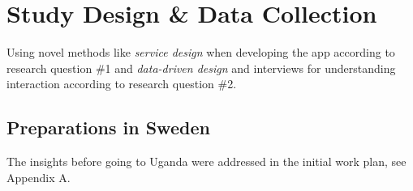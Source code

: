 \section{Study Design \& Data Collection}

Using novel methods like \textit{service design} when developing the app according to research question \#1 and \textit{data-driven design} and interviews for understanding interaction according to research question \#2.



\subsection{Preparations in Sweden}

The insights before going to Uganda were addressed in the initial work plan, see Appendix A. 








